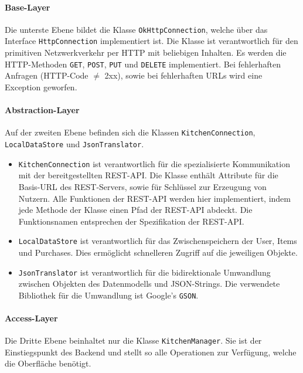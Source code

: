 \documentclass{scrartcl}
\begin{document}
			\paragraph*{Base-Layer}
			Die unterste Ebene bildet die Klasse \texttt{OkHttpConnection}, welche über das Interface \texttt{HttpConnection} implementiert ist. Die Klasse ist verantwortlich für den primitiven Netzwerkverkehr per HTTP mit beliebigen Inhalten. Es werden die HTTP-Methoden \texttt{GET}, \texttt{POST}, \texttt{PUT} und \texttt{DELETE} implementiert. Bei fehlerhaften Anfragen (HTTP-Code $\neq$ 2xx), sowie bei fehlerhaften URLs wird eine Exception geworfen.
			
			\paragraph*{Abstraction-Layer}
			Auf der zweiten Ebene befinden sich die Klassen \texttt{KitchenConnection}, \texttt{LocalDataStore} und \texttt{JsonTranslator}.
			
			\begin{itemize}
				\item  \texttt{KitchenConnection} ist verantwortlich für die spezialisierte Kommunikation mit der bereitgestellten REST-API. Die Klasse enthält Attribute für die Basis-URL des REST-Servers, sowie für Schlüssel zur Erzeugung von Nutzern. Alle Funktionen der REST-API werden hier implementiert, indem jede Methode der Klasse einen Pfad der REST-API abdeckt. Die Funktionsnamen entsprechen der Spezifikation der REST-API.
				
				\item \texttt{LocalDataStore} ist verantwortlich für das Zwischenspeichern der User, Items und Purchases. Dies ermöglicht schnelleren Zugriff auf die jeweiligen Objekte.
				
				\item \texttt{JsonTranslator} ist verantwortlich für die bidirektionale Umwandlung zwischen Objekten des Datenmodells und JSON-Strings. Die verwendete Bibliothek für die Umwandlung ist Google's \texttt{GSON}.
			\end{itemize}
		
			\paragraph*{Access-Layer}
			Die Dritte Ebene beinhaltet nur die Klasse \texttt{KitchenManager}. Sie ist der Einstiegspunkt des Backend und stellt so alle Operationen zur Verfügung, welche die Oberfläche benötigt.
		
\end{document}
